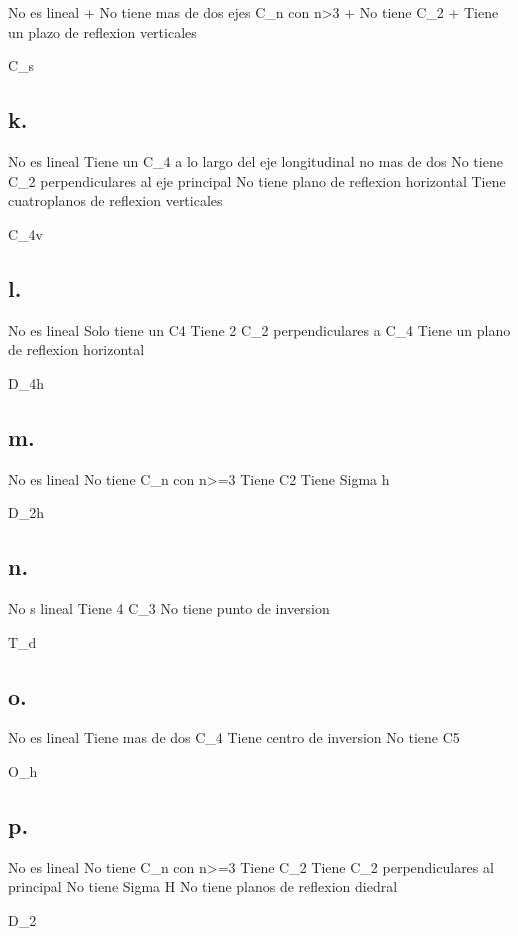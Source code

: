 No es lineal
+ No tiene mas de dos ejes C_n con n>3
+ No tiene C_2
+ Tiene un plazo de reflexion verticales

C_s


\subsection*{k. }

No es lineal
Tiene un C_4 a lo largo del eje longitudinal no mas de dos
No tiene C_2 perpendiculares al eje principal
No tiene plano de reflexion horizontal
Tiene cuatroplanos de reflexion verticales

C_4v


\subsection*{l. }

No es lineal
Solo tiene un C4
Tiene 2 C_2 perpendiculares a C_4
Tiene un plano de reflexion horizontal

D_4h


\subsection*{m. }

No es lineal
No tiene C_n con n>=3
Tiene C2
Tiene Sigma h

D_2h


\subsection*{n. }

No s lineal
Tiene 4 C_3
No tiene punto de inversion


T_d


\subsection*{o. }

No es lineal
Tiene mas de dos C_4
Tiene centro de inversion 
No tiene C5

O_h


\subsection*{p. }

No es lineal
No tiene C_n con n>=3
Tiene C_2
Tiene C_2 perpendiculares al principal
No tiene Sigma H
No tiene planos de reflexion diedral

D_2